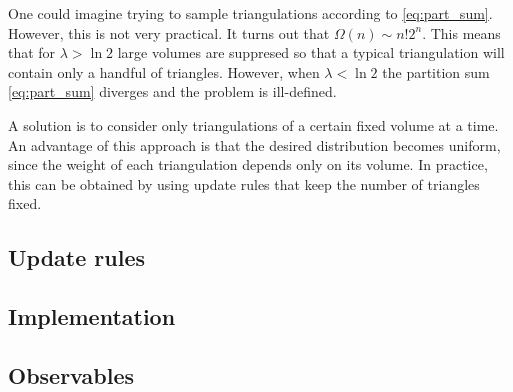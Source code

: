 One could imagine trying to sample triangulations according to \eqref{eq:part_sum}.
However, this is not very practical. It turns out that $\Omega(n) \sim n! 2^n$. This means that for $\lambda > \ln 2$ large volumes are suppresed so that a typical triangulation will contain only a handful of triangles.
However, when $\lambda < \ln 2$ the partition sum \eqref{eq:part_sum} diverges and the problem is ill-defined.

A solution is to consider only triangulations of a certain fixed volume at a time.
An advantage of this approach is that the desired distribution becomes uniform, since the weight of each triangulation depends only on its volume.
In practice, this can be obtained by using update rules that keep the number of triangles fixed.

\subsection{Update rules}

\subsection{Implementation}

\subsection{Observables}
